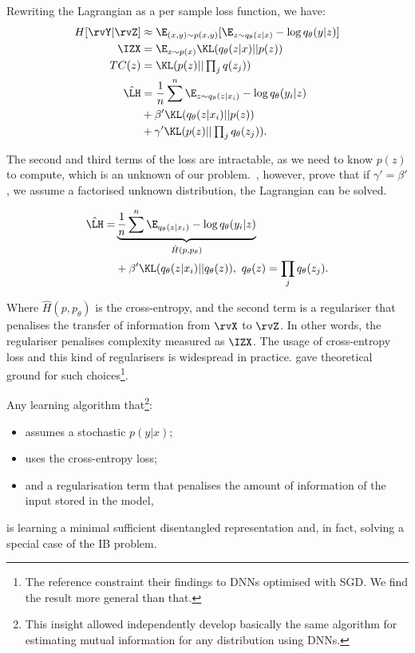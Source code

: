     Rewriting the Lagrangian as a per sample loss function, we have:
    \begin{align}
        H[\rvY|\rvZ] & \approx \E_{(x,y) \sim p(x,y)}[\E_{z \sim q_{\theta}(z|x)} - \log q_{\theta}(y|z)] \\
        \IZX & = \E_{x \sim p(x)} \KL(q_{\theta}(z|x)||p(z))\\
        TC(z) &= \KL(p(z)||\textstyle \prod_j q(z_j))\\
        \hat{\LH} &= \frac{1}{n} \sum^{n} \E_{z \sim q_{\theta}(z|x_i)} - \log q_{\theta}(y_i|z) \nonumber\\
         &+ \beta' \KL(q_{\theta}(z|x_i)||p(z)) \nonumber\\
         &+ \gamma' \KL(p(z)||\textstyle \prod_j q_{\theta}(z_j)).
    \end{align}

    The second and third terms of the loss are intractable, as we need to know $p(z)$ to compute, which is an unknown of our problem.~\cite{achille:2018infodropout}, however, prove that if $\gamma'=\beta'$, \ie we assume a factorised unknown distribution, the Lagrangian can be solved.

    \begin{align}
    \hat{\LH} = &\underbrace{\frac{1}{n} \sum^{n} \E_{q_{\theta}(z|x_i)} - \log q_{\theta}(y_i|z)}_{\hat H(p, p_{\theta})}\nonumber\\
    &+ \beta' \KL (q_{\theta}(z|x_i)||q_{\theta}(z)),~
    q_\theta(z)=\prod_j q_{\theta}(z_j).
    \end{align}

    Where $\hat H(p, p_{\theta})$ is the cross-entropy, and the second term is a regulariser that penalises the transfer of information from $\rvX$ to $\rvZ$. In other words, the regulariser penalises complexity measured as $\IZX$. The usage of cross-entropy loss and this kind of regularisers is widespread in practice. \cite{achille:2019phd} gave theoretical ground for such choices\footnote{The reference constraint their findings to \acp{DNN} optimised with \ac{SGD}. We find the result more general than that.}.

    \begin{corollary}
    Any learning algorithm that\footnote{This insight allowed \cite{alemi:2016,achille:2018infodropout} independently develop basically the same algorithm for estimating mutual information for any distribution using \acp{DNN}.}:
     \begin{itemize}
         \item assumes a stochastic $p(y|x)$;
         \item uses the cross-entropy loss;
         \item and a regularisation term that penalises the amount of information of the input stored in the model,
     \end{itemize} is learning a minimal sufficient disentangled representation and, in fact, solving a special case of the IB problem.
\end{corollary}

